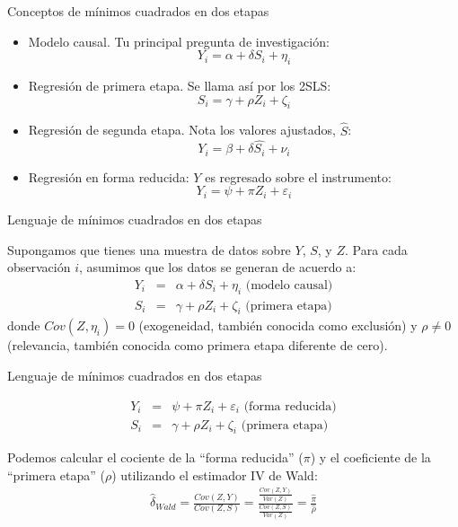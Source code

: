 \documentclass{beamer}
\begin{document}
\begin{frame}{Conceptos de mínimos cuadrados en dos etapas}

	\begin{itemize}
	\item Modelo causal. Tu principal pregunta de investigación: $$Y_i=\alpha + \delta{S_i} + \eta_i$$
	\item Regresión de primera etapa. Se llama así por los 2SLS: $$S_i = \gamma + \rho{Z_i} + \zeta_i$$
	\item Regresión de segunda etapa. Nota los valores ajustados, $\widehat{S}$: $$Y_i=\beta + \delta{\widehat{S_i}} + \nu_i$$
	\item Regresión en forma reducida: $Y$ es regresado sobre el instrumento: $$Y_i=\psi + \pi{Z_i} + \varepsilon_i$$
	\end{itemize}
\end{frame}


\begin{frame}{Lenguaje de mínimos cuadrados en dos etapas}

Supongamos que tienes una muestra de datos sobre $Y$, $S$, y $Z$. Para cada observación $i$, asumimos que los datos se generan de acuerdo a:
		\begin{eqnarray*}
		Y_i &=& \alpha + \delta{S}_i + \eta_i \text{ (modelo causal)}\\
		S_i &=& \gamma + \rho{Z}_i + \zeta_i \text{ (primera etapa)}
		\end{eqnarray*} 
donde $Cov(Z,\eta_i)=0$ (exogeneidad, también conocida como exclusión) y $\rho\neq{0}$ (relevancia, también conocida como primera etapa diferente de cero).
\end{frame}


\begin{frame}{Lenguaje de mínimos cuadrados en dos etapas}

		\begin{eqnarray*}
		Y_i &=& \psi + \pi{Z_i} + \varepsilon_i \text{ (forma reducida)} \\
		S_i &=& \gamma + \rho{Z}_i + \zeta_i \text{ (primera etapa)}
		\end{eqnarray*}
		
		\bigskip
		
Podemos calcular el cociente de la ``forma reducida'' ($\pi$) y el coeficiente de la ``primera etapa'' ($\rho$) utilizando el estimador IV de Wald:
		\begin{eqnarray*}
		\widehat{\delta}_{Wald} = \frac{ Cov(Z,Y)}{Cov(Z,S)} = \frac{ \frac{Cov(Z,Y)}{Var(Z)}}{ \frac{Cov(Z,S)}{Var(Z)}} = \frac{\widehat{\pi}}{\widehat{\rho}}
		\end{eqnarray*}
\end{frame}
\end{document}

